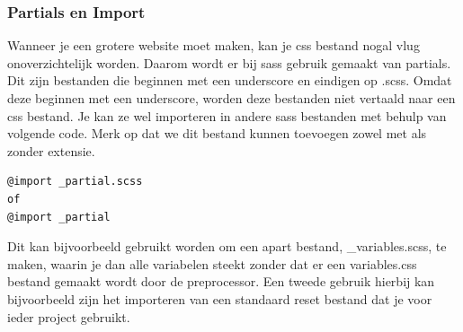 \documentclass[pdftex,a4paper,12pt,twoside]{report}
\begin{document}
\subsubsection{Partials en Import}
Wanneer je een grotere website moet maken, kan je css bestand nogal vlug onoverzichtelijk worden. Daarom wordt er bij sass gebruik gemaakt van partials. Dit zijn bestanden die beginnen met een underscore en eindigen op .scss.\newline
Omdat deze beginnen met een underscore, worden deze bestanden niet vertaald naar een css bestand. Je kan ze wel importeren in andere sass bestanden met behulp van volgende code. Merk op dat we dit bestand kunnen toevoegen zowel met als zonder extensie.
\begin{lstlisting}
@import _partial.scss
of
@import _partial
\end{lstlisting}
Dit kan bijvoorbeeld gebruikt worden om een apart bestand, \_variables.scss, te maken, waarin je dan alle variabelen steekt zonder dat er een variables.css bestand gemaakt wordt door de preprocessor.\newline
Een tweede gebruik hierbij kan bijvoorbeeld zijn het importeren van een standaard reset bestand dat je voor ieder project gebruikt.
\end{document}
